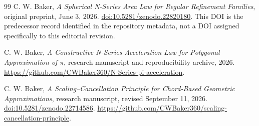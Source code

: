 \documentclass[11pt]{article}
\theoremstyle{remark}
\begin{document}
\begin{thebibliography}{99}
C. W. Baker, \emph{A Spherical N-Series Area Law for Regular Refinement Families},
original preprint, June 3, 2026.
\href{https://doi.org/10.5281/zenodo.22820180}{doi:10.5281/zenodo.22820180}.
This DOI is the predecessor record identified in the repository metadata,
not a DOI assigned specifically to this editorial revision.

C. W. Baker, \emph{A Constructive N-Series Acceleration Law for
Polygonal Approximation of $\pi$}, research manuscript and reproducibility
archive, 2026.
\url{https://github.com/CWBaker360/N-Series-pi-acceleration}.

C. W. Baker, \emph{A Scaling--Cancellation Principle for Chord-Based
Geometric Approximations}, research manuscript, revised
September 11, 2026.
\href{https://doi.org/10.5281/zenodo.22714586}{doi:10.5281/zenodo.22714586}.
\url{https://github.com/CWBaker360/scaling-cancellation-principle}.



\end{thebibliography}
\end{document}
